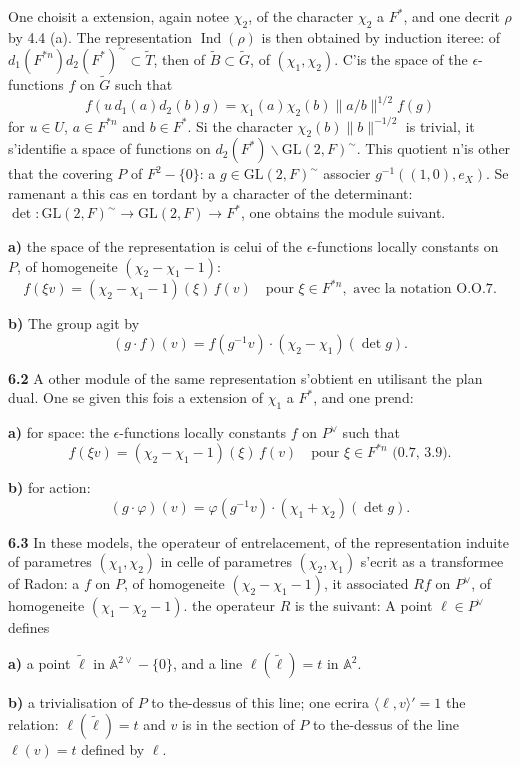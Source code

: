 \documentclass[12pt,a4paper]{article}
\theoremstyle{plain}
\theoremstyle{definition}
\theoremstyle{remark}
\DeclareMathOperator{\Ind}{Ind}
\newcommand{\wt}{\widetilde}
\providecommand{\AA}{\mathbb{A}}
\begin{document}
One choisit a extension, again notee $\chi_2$, of the character $\chi_2$ a $F^*$, and one decrit $\rho$ by 4.4 (a). The representation $\Ind(\rho)$ is then obtained by induction iteree: of $d_1(F^{*n}) d_2(F^*)^\sim \subset \wt{T}$, then of $\wt{B} \subset \wt{G}$, of $(\chi_1, \chi_2)$. C'is the space of the $\epsilon$-functions $f$ on $\wt{G}$ such that
\[
f(u \, d_1(a) d_2(b) g) = \chi_1(a) \chi_2(b) \|a/b\|^{1/2} f(g)
\]
for $u \in U$, $a \in F^{*n}$ and $b \in F^*$. Si the character $\chi_2(b) \|b\|^{-1/2}$ is trivial, it s'identifie a space of functions on $d_2(F^*) \backslash \mathrm{GL}(2, F)^\sim$. This quotient n'is other that the covering $P$ of $F^2 - \{0\}$: a $g \in \mathrm{GL}(2, F)^\sim$ associer $g^{-1}((1, 0), e_X)$. Se ramenant a this cas en tordant by a character of the determinant: $\det : \mathrm{GL}(2, F)^\sim \to \mathrm{GL}(2, F) \to F^*$, one obtains the module suivant.

\textbf{a)} the space of the representation is celui of the $\epsilon$-functions locally constants on $P$, of homogeneite $(\chi_2 - \chi_1 - 1)$:
\[
f(\xi v) = (\chi_2 - \chi_1 - 1)(\xi) \, f(v) \quad \text{pour } \xi \in F^{*n}, \text{ avec la notation O.O.7}.
\]

\textbf{b)} The group agit by
\[
(g \cdot f)(v) = f(g^{-1} v) \cdot (\chi_2 - \chi_1)(\det g).
\]

\textbf{6.2} A other module of the same representation s'obtient en utilisant the plan dual. One se given this fois a extension of $\chi_1$ a $F^*$, and one prend:

\textbf{a)} for space: the $\epsilon$-functions locally constants $f$ on $P^\vee$ such that
\[
f(\xi v) = (\chi_2 - \chi_1 - 1)(\xi) \, f(v) \quad \text{pour } \xi \in F^{*n} \text{ (0.7, 3.9)}.
\]

\textbf{b)} for action:
\[
(g \cdot \varphi)(v) = \varphi(g^{-1} v) \cdot (\chi_1 + \chi_2)(\det g).
\]

\textbf{6.3} In these models, the operateur of entrelacement, of the representation induite of parametres $(\chi_1, \chi_2)$ in celle of parametres $(\chi_2, \chi_1)$ s'ecrit as a transformee of Radon: a $f$ on $P$, of homogeneite $(\chi_2 - \chi_1 - 1)$, it associated $Rf$ on $P^\vee$, of homogeneite $(\chi_1 - \chi_2 - 1)$. the operateur $R$ is the suivant: A point $\ell \in P^\vee$ defines

\textbf{a)} a point $\wt{\ell}$ in $\AA^{2\vee} - \{0\}$, and a line $\ell(\wt{\ell}) = t$ in $\AA^2$.

\textbf{b)} a trivialisation of $P$ to the-dessus of this line; one ecrira $\langle \ell, v \rangle' = 1$ the relation: $\ell(\wt{\ell}) = t$ and $v$ is in the section of $P$ to the-dessus of the line $\ell(v) = t$ defined by $\ell$.
\end{document}
